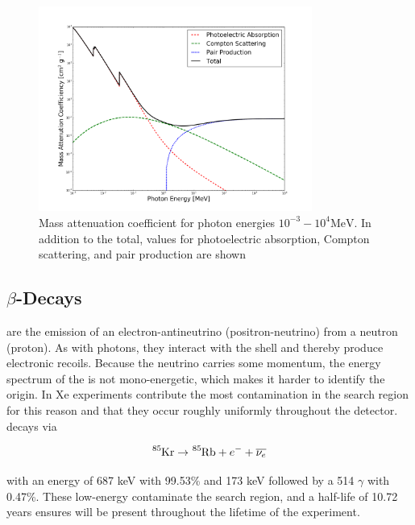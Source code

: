 \begin{figure}
 \centering
 \includegraphics[width=0.8\textwidth]{PhotonAttenuation}
 \caption{Mass attenuation coefficient for photon energies $10^{-3} - 10^{4} \mathrm{MeV}$.  In addition to the total, values for
 photoelectric absorption,
 Compton scattering, and pair production are shown}
 \label{fig:phot_atten}
\end{figure}


\subsection{$\beta$-Decays}
\label{subsec:beta}
\betadecays are the emission of an electron-antineutrino (positron-neutrino) from a neutron (proton).  As with photons, they interact
with the \electron shell and thereby produce electronic recoils.  Because the neutrino carries
some momentum, the energy spectrum of the \electron is not mono-energetic, which makes it harder to identify the origin.  In Xe
experiments \betadecays contribute the most contamination in the search region for this reason and that they occur roughly uniformly
throughout the detector.  \krypton decays via

\begin{equation}
\ce{^{85}Kr} \rightarrow \ce{^{85}Rb} + e^{-} + \overline{\nu_{e}}
\end{equation}

\noindent with an energy of 687 keV with 99.53\% and 173 keV followed by a 514 $\gamma$ with 0.47\%.  These low-energy \betadecays
contaminate the search region, and a half-life of 10.72 years ensures  will be present throughout the lifetime of the
experiment.

